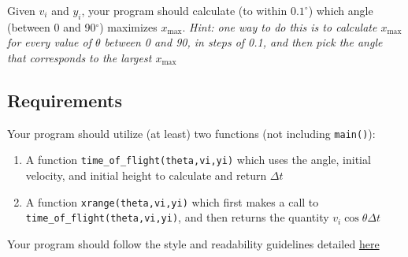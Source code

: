 \documentclass{article}
\begin{document}
Given $v_i$ and $y_i$, your program should calculate (to within $0.1^\circ$) which angle (between 0 and 90$^\circ$) maximizes $x_\mathrm{max}$.
\textit{Hint: one way to do this is to calculate $x_\mathrm{max}$ for every value of $\theta$ between 0 and 90, in steps of 0.1, and then pick the angle that corresponds to the largest $x_\mathrm{max}$}

\subsection*{Requirements}
Your program should utilize (at least) two functions (not including \texttt{main()}):
\begin{enumerate}
	\item A function \texttt{time\_of\_flight(theta,vi,yi)} which uses the angle, initial velocity, and initial height to calculate and return $\Delta t$
	\item A function \texttt{xrange(theta,vi,yi)} which first makes a call to \texttt{time\_of\_flight(theta,vi,yi)}, and then returns the quantity $v_i\cos{\theta}\Delta t$
\end{enumerate}
Your program should follow the style and readability guidelines detailed \href{https://drive.google.com/file/d/1SFf6Rhv8LydlrUhf85QhMuiZb_IKRS4N/view?usp=sharing}{here}
\end{document}
